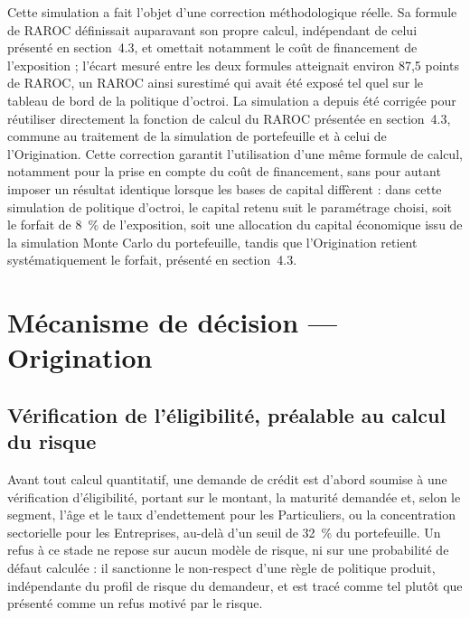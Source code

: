 Cette simulation a fait l'objet d'une correction méthodologique réelle. Sa formule de RAROC définissait auparavant son propre calcul, indépendant de celui présenté en section~4.3, et omettait notamment le coût de financement de l'exposition ; l'écart mesuré entre les deux formules atteignait environ 87,5 points de RAROC, un RAROC ainsi surestimé qui avait été exposé tel quel sur le tableau de bord de la politique d'octroi. La simulation a depuis été corrigée pour réutiliser directement la fonction de calcul du RAROC présentée en section~4.3, commune au traitement de la simulation de portefeuille et à celui de l'Origination. Cette correction garantit l'utilisation d'une même formule de calcul, notamment pour la prise en compte du coût de financement, sans pour autant imposer un résultat identique lorsque les bases de capital diffèrent : dans cette simulation de politique d'octroi, le capital retenu suit le paramétrage choisi, soit le forfait de 8~\% de l'exposition, soit une allocation du capital économique issu de la simulation Monte Carlo du portefeuille, tandis que l'Origination retient systématiquement le forfait, présenté en section~4.3.

\section{Mécanisme de décision — Origination}

\subsection{Vérification de l'éligibilité, préalable au calcul du risque}

Avant tout calcul quantitatif, une demande de crédit est d'abord soumise à une vérification d'éligibilité, portant sur le montant, la maturité demandée et, selon le segment, l'âge et le taux d'endettement pour les Particuliers, ou la concentration sectorielle pour les Entreprises, au-delà d'un seuil de 32~\% du portefeuille. Un refus à ce stade ne repose sur aucun modèle de risque, ni sur une probabilité de défaut calculée : il sanctionne le non-respect d'une règle de politique produit, indépendante du profil de risque du demandeur, et est tracé comme tel plutôt que présenté comme un refus motivé par le risque.

